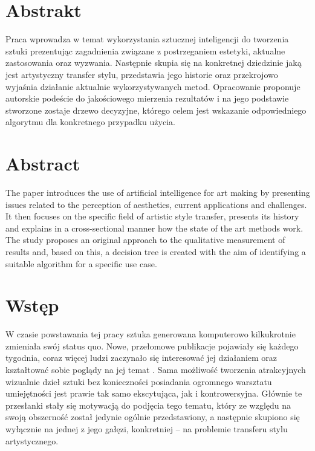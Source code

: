 \documentclass[12pt]{article}
\begin{document}
\newpage

\tableofcontents

\newpage

\section*{Abstrakt}

\indent

Praca wprowadza w temat wykorzystania sztucznej inteligencji do tworzenia sztuki prezentując zagadnienia związane z postrzeganiem estetyki, aktualne zastosowania oraz wyzwania. Następnie skupia się na konkretnej dziedzinie jaką jest artystyczny transfer stylu, przedstawia jego historie oraz przekrojowo wyjaśnia działanie aktualnie wykorzystywanych metod. Opracowanie proponuje autorskie podeście do jakościowego mierzenia rezultatów i na jego podstawie stworzone zostaje drzewo decyzyjne, którego celem jest wskazanie odpowiedniego algorytmu dla konkretnego przypadku użycia.

\section*{Abstract}

\indent

The paper introduces the use of artificial intelligence for art making by presenting issues related to the perception of aesthetics, current applications and challenges. It then focuses on the specific field of artistic style transfer, presents its history and explains in a cross-sectional manner how the state of the art methods work. The study proposes an original approach to the qualitative measurement of results and, based on this, a decision tree is created with the aim of identifying a suitable algorithm for a specific use case.
\newpage

\section*{Wstęp}
\indent 

W czasie powstawania tej pracy sztuka generowana komputerowo kilkukrotnie zmieniała swój status quo. Nowe, przełomowe publikacje pojawiały się każdego tygodnia, coraz więcej ludzi zaczynało się interesować jej działaniem oraz kształtować sobie poglądy na jej temat . Sama możliwość tworzenia atrakcyjnych wizualnie dzieł sztuki bez konieczności posiadania ogromnego warsztatu umiejętności jest prawie tak samo ekscytująca, jak i kontrowersyjna. Głównie te przesłanki stały się motywacją do podjęcia tego tematu, który ze względu na swoją obszerność został jedynie ogólnie przedstawiony, a następnie skupiono się wyłącznie na jednej z jego gałęzi, konkretniej – na problemie transferu stylu artystycznego.
\end{document}
